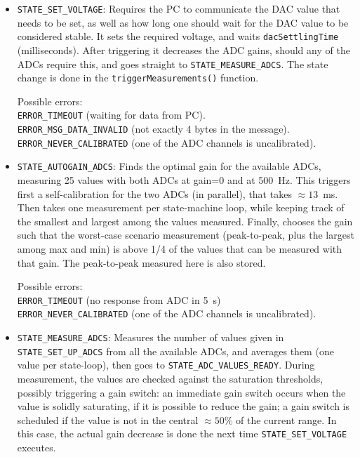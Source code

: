 \documentclass[11pt,a4paper,english]{article}
\begin{document}
\begin{itemize}
\item \texttt{STATE\_SET\_VOLTAGE}: Requires the PC to communicate the DAC value that needs to be set, as well as how long one should wait for the DAC value to be considered stable. It sets the required voltage, and waits \texttt{dacSettlingTime} (milliseconds). After triggering it decreases the ADC gains, should any of the ADCs require this, and goes straight to \texttt{STATE\_MEASURE\_ADCS}. The state change is done in the \texttt{triggerMeasurements()} function.
	
	Possible errors:\\\texttt{ERROR\_TIMEOUT} (waiting for data from PC).\\\texttt{ERROR\_MSG\_DATA\_INVALID} (not exactly 4 bytes in the message).\\\texttt{ERROR\_NEVER\_CALIBRATED} (one of the ADC channels is uncalibrated).

\item \texttt{STATE\_AUTOGAIN\_ADCS}: Finds the optimal gain for the available ADCs, measuring 25 values with both ADCs at gain=0 and at 500~Hz. This triggers first a self-calibration for the two ADCs (in parallel), that takes $\approx13$~ms. Then takes one measurement per state-machine loop, while keeping track of the smallest and largest among the values measured. Finally, chooses the gain such that the worst-case scenario measurement (peak-to-peak, plus the largest among max and min) is above 1/4 of the values that can be measured with that gain. The peak-to-peak measured here is also stored.

	Possible errors:\\\texttt{ERROR\_TIMEOUT} (no response from ADC in 5~s)\\\texttt{ERROR\_NEVER\_CALIBRATED} (one of the ADC channels is uncalibrated).

\item \texttt{STATE\_MEASURE\_ADCS}: Measures the number of values given in \texttt{STATE\_SET\_UP\_ADCS} from all the available ADCs, and averages them (one value per state-loop), then goes to \texttt{STATE\_ADC\_VALUES\_READY}. During measurement, the values are checked against the saturation thresholds, possibly triggering a gain switch: an immediate gain switch occurs when the value is solidly saturating, if it is possible to reduce the gain; a gain switch is scheduled if the value is not in the central $\approx50\%$ of the current range. In this case, the actual gain decrease is done the next time \texttt{STATE\_SET\_VOLTAGE} executes.


\end{itemize}
\end{document}
